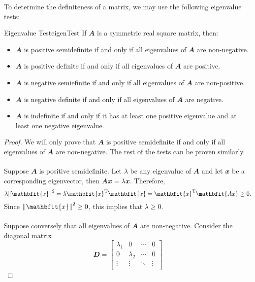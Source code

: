 \documentclass[math]{amznotes}
\theoremstyle{remark}
\begin{document}
To determine the definiteness of a matrix, we may use the following eigenvalue tests:
\begin{thmbox}{Eigenvalue Test}{eigenTest}
    If $\mathbfit{A}$ is a symmetric real square matrix, then:
    \begin{itemize}
        \item $\mathbfit{A}$ is positive semidefinite if and only if all eigenvalues of $\mathbfit{A}$ are non-negative.
        \item $\mathbfit{A}$ is positive definite if and only if all eigenvalues of $\mathbfit{A}$ are positive.
        \item $\mathbfit{A}$ is negative semiefinite if and only if all eigenvalues of $\mathbfit{A}$ are non-positive.
        \item $\mathbfit{A}$ is negative definite if and only if all eigenvalues of $\mathbfit{A}$ are negative.
        \item $\mathbfit{A}$ is indefinite if and only if it has at least one positive eigenvalue and at least one negative eigenvalue.
    \end{itemize}
    \tcblower
    \begin{proof}
        We will only prove that $\mathbfit{A}$ is positive semidefinite if and only if all eigenvalues of $\mathbfit{A}$ are non-negative. The rest of the tests can be proven similarly.
        \\\\
        Suppose $\mathbfit{A}$ is positive semidefinite. Let $\lambda$ be any eigenvalue of $\mathbfit{A}$ and let $\mathbfit{x}$ be a corresponding eigenvector, then $\mathbfit{Ax} = \lambda\mathbfit{x}$. Therefore,
        \begin{equation*}
            \lambda\norm{\mathbfit{x}}^2 = \lambda\mathbfit{x}^{\mathrm{T}}\mathbfit{x} = \mathbfit{x}^{\mathrm{T}}\mathbfit{Ax} \geq 0.
        \end{equation*}
        Since $\norm{\mathbfit{x}}^2 \geq 0$, this implies that $\lambda \geq 0$.
        \\\\
        Suppose conversely that all eigenvalues of $\mathbfit{A}$ are non-negative. Consider the diagonal matrix
        \begin{displaymath}
            \mathbfit{D} = \begin{bmatrix}
                \lambda_1 & 0 & \cdots & 0 \\
                0 & \lambda_2 & \cdots & 0 \\
                \vdots & \vdots & \ddots & \vdots \\

\end{bmatrix}
\end{displaymath}
\end{proof}
\end{thmbox}
\end{document}
